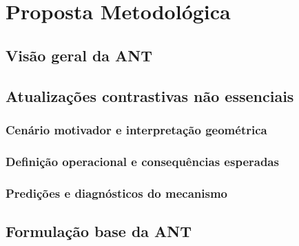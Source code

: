 \chapter{Proposta Metodológica}
\label{ch:proposta}


\section{Visão geral da ANT}

\section{Atualizações contrastivas não essenciais}

\subsection{Cenário motivador e interpretação geométrica}

\subsection{Definição operacional e consequências esperadas}

\subsection{Predições e diagnósticos do mecanismo}

\section{Formulação base da ANT}

